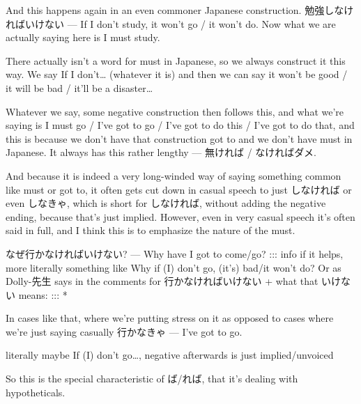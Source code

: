 And this happens again in an even commoner Japanese construction. 勉強しなければいけない --- If I don't study, it won't go / it won't do. Now what we are actually saying here is I must study.

{}

There actually isn't a word for must in Japanese, so we always construct it this way. We say If I don't\ldots{} (whatever it is) and then we can say it won't be good / it will be bad / it'll be a disaster\ldots{}

Whatever we say, some negative construction then follows this, and what we're saying is I must go / I've got to go / I've got to do this / I've got to do that, and this is because we don't have that construction got to and we don't have must in Japanese. It always has this rather lengthy  --- 無ければ / なければダメ.

And because it is indeed a very long-winded way of saying something common like must or got to, it often gets cut down in casual speech to just しなければ or even しなきゃ, which is short for しなければ, without adding the negative ending, because that's just implied. However, even in very casual speech it's often said in full, and I think this is to emphasize the nature of the must.

なぜ行かなければいけない? --- Why have I got to come/go? ::: info if it helps, more literally something like Why if (I) don't go, (it's) bad/it won't do? Or as Dolly-先生 says in the comments for 行かなければいけない + what that いけない means: ::: *{}{\bf }{}

In cases like that, where we're putting stress on it as opposed to cases where we're just saying casually 行かなきゃ --- I've got to go.

literally maybe If (I) don't go\ldots{}, negative afterwards is just implied/unvoiced

So this is the special characteristic of ば/れば, that it's dealing with hypotheticals.

\stopsectionlevel
